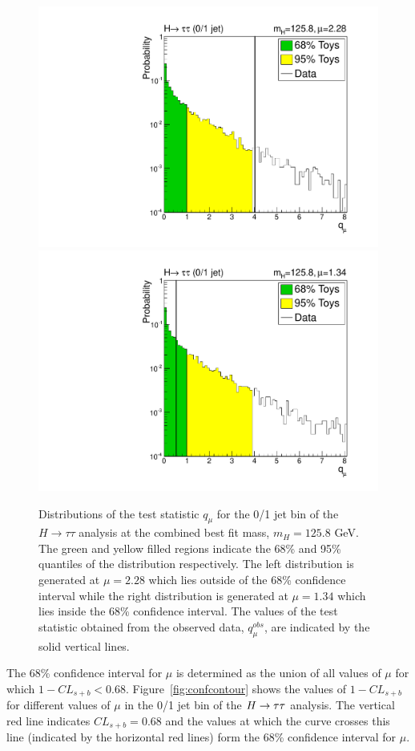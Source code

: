 \begin{figure}
\begin{center}
\includegraphics[width=.49\textwidth]{combinations/fceg_htt_2.pdf}
\includegraphics[width=.49\textwidth]{combinations/fceg_htt_1.pdf}
\end{center}
\caption{Distributions of the test statistic $q_{\mu}$ for the 0/1 jet bin 
of the $H\rightarrow \tau\tau$ analysis at the combined best fit mass, $m_{H} = 125.8$ GeV.
The green and yellow filled regions indicate the 68\% and 95\% quantiles of the 
distribution respectively. 
The left distribution is generated at $\mu=2.28$ 
which lies outside of the 68\% confidence interval
while the right distribution is generated at $\mu=1.34$ which lies inside the 
68\% confidence interval. The values of the test statistic obtained from the observed data, 
$q_{\mu}^{obs}$, are indicated by the solid vertical lines.}
\label{fig:fcegtoys}
\end{figure}
The 68\% confidence interval for $\mu$ is determined as the union of all values of $\mu$ for 
which $1-CL_{s+b}<0.68$.
Figure~\ref{fig:confcontour} shows the values of $1-CL_{s+b}$ for different values of 
$\mu$ in the 0/1 jet bin of the $H\rightarrow\tau\tau$ analysis.
The vertical red line indicates $CL_{s+b}=0.68$ and the values at which the curve
crosses this line (indicated by the horizontal red lines) form the 68\% confidence 
interval for $\mu$.
